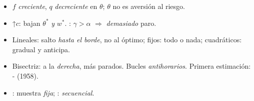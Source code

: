 \documentclass{article}
\begin{document}
\begin{columnas}
\begin{trampa}
\begin{itemize}
\item $f$ \emph{creciente}, $q$ \emph{decreciente} en $\theta$; $\theta$ no es aversión al riesgo.
\item ↑$c$: bajan $\theta^*$ \emph{y} $w^*$. : $\gamma>\alpha$ $\Rightarrow$ \emph{demasiado} paro.
\item Lineales: salto \emph{hasta el borde}, no al óptimo; fijos: todo o nada; cuadráticos: gradual y anticipa.
\item Bisectriz: a la \emph{derecha}, más parados. Bucles \emph{antihorarios}. Primera estimación: - (1958).
\item {}: muestra \emph{fija}; : \emph{secuencial}.
\end{itemize}
\end{trampa}

\end{columnas}
\end{document}
